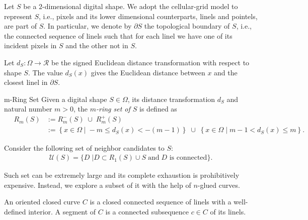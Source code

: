 Let $S$ be a $2$-dimensional digital shape. We adopt the cellular-grid model to represent $S$, i.e., pixels and its lower dimensional counterparts, linels and pointels, are part of $S$. In particular, we denote by $\partial S$ the topological boundary of $S$, i.e., the connected sequence of linels such that for each linel we have one of its incident pixels in $S$ and the other not in $S$.


Let $d_{S}:\Omega \rightarrow \mathcal{R}$ be the signed Euclidean distance transformation with respect to shape $S$. The value $d_S(x)$ gives the Euclidean distance between $x$ and the closest linel in $\partial S$. 

\begin{definition}{m-Ring Set}
Given a digital shape $S\in\Omega$, its distance transformation $d_S$ and natural number $m > 0$, the {\em $m$-ring set of $S$} is defined as
\begin{align*}
	\quad R_m(S) &:= R_m^-(S) \; \cup \; R_m^+(S) \\
	&:= \left\{ x \in \Omega \; | \; -m \leq d_S(x) < -(m-1) \right\} \; \cup \;  \left\{ x \in \Omega \; | \; 	m-1 < d_{S}(x) \leq m \right\}.
\end{align*}
\end{definition}

Consider the following set of neighbor candidates to $S$:
\begin{align*}
\mathcal{U}(S) = \{ D \; | D \subset R_1(S) \cup S \; \text{and} \; \text{$D$ is connected} \}.
\end{align*}


Such set can be extremely large and its complete exhaustion is prohibitively expensive.  Instead, we explore a subset of it with the help of $n$-glued curves.

An oriented closed curve $C$ is a closed connected sequence of linels with a well-defined interior. A segment of $C$ is a connected subsequence $c \in C$ of its linels.


